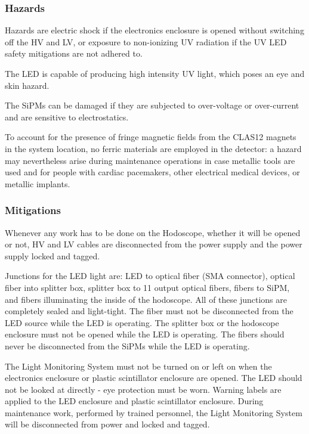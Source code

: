\subsubsection{Hazards} 

Hazards are electric shock if the electronics enclosure is opened without switching off the 
HV and LV, or exposure to non-ionizing UV radiation if the UV LED safety mitigations are not 
adhered to.

The LED is capable of producing high intensity UV light, which poses an eye and skin hazard. 

The SiPMs can be damaged if they are subjected to over-voltage or over-current and are sensitive 
to electrostatics.

To account for the presence of fringe magnetic fields from the CLAS12 magnets in the system 
location, no ferric materials are employed in the detector: a hazard may nevertheless arise 
during maintenance operations in case metallic tools are used and for people with cardiac 
pacemakers, other electrical medical devices, or metallic implants.

\subsubsection{Mitigations}

Whenever any work has to be done on the Hodoscope, whether it will be opened or not, HV and 
LV cables are disconnected from the power supply and the power supply locked and tagged.

Junctions for the LED light are: LED to optical fiber (SMA connector), optical fiber into 
splitter box, splitter box to 11 output optical fibers, fibers to SiPM, and fibers illuminating 
the inside of the hodoscope. All of these junctions are completely sealed and light-tight. The 
fiber must not be disconnected from the LED source while the LED is operating. The splitter box 
or the hodoscope enclosure must not be opened while the LED is operating. The fibers should 
never be disconnected from the SiPMs while the LED is operating. 

The Light Monitoring System must not be turned on or left on when the electronics enclosure 
or plastic scintillator enclosure are opened. The LED should not be looked at directly - eye 
protection must be worn. Warning labels are applied to the LED enclosure and plastic 
scintillator enclosure.  During maintenance work, performed by trained personnel, the Light 
Monitoring System will be disconnected from power and locked and tagged.


